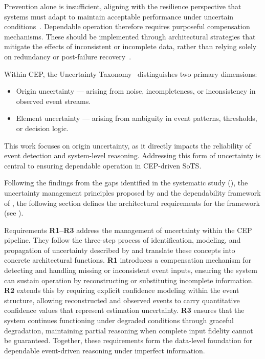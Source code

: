 Prevention alone is insufficient, aligning with the resilience perspective that systems must adapt to maintain acceptable performance under uncertain conditions~\cite{madni2020constructing, ed2018deterministic}. Dependable operation therefore requires purposeful compensation mechanisms. These should be implemented through architectural strategies that mitigate the effects of inconsistent or incomplete data, rather than relying solely on redundancy or post-failure recovery~\cite{bukowski2016system}. 

Within CEP, the Uncertainty Taxonomy~\cite{wasserkrug2006taxonomy} distinguishes two primary dimensions:
\begin{itemize}[noitemsep, topsep=0pt]
    \item Origin uncertainty — arising from noise, incompleteness, or inconsistency in observed event streams.
    \item Element uncertainty — arising from ambiguity in event patterns, thresholds, or decision logic.
\end{itemize}
This work focuses on origin uncertainty, as it directly impacts the reliability of event detection and system-level reasoning. Addressing this form of uncertainty is central to ensuring dependable operation in CEP-driven SoTS.

Following the findings from the gaps identified in the systematic study (), the uncertainty management principles proposed by \citet{cugola2015complex} and the dependability framework of \citet{avizienis2004basic}, the following section defines the architectural requirements for the framework (see ).



Requirements \textbf{R1--R3} address the management of uncertainty within the CEP pipeline.  
They follow the three-step process of identification, modeling, and propagation of uncertainty described by \citet{cugola2015complex} and translate these concepts into concrete architectural functions.  
\textbf{R1} introduces a compensation mechanism for detecting and handling missing or inconsistent event inputs, ensuring the system can sustain operation by reconstructing or substituting incomplete information.  
\textbf{R2} extends this by requiring explicit confidence modeling within the event structure, allowing reconstructed and observed events to carry quantitative confidence values that represent estimation uncertainty.  
\textbf{R3} ensures that the system continues functioning under degraded conditions through graceful degradation, maintaining partial reasoning when complete input fidelity cannot be guaranteed.  
Together, these requirements form the data-level foundation for dependable event-driven reasoning under imperfect information.


